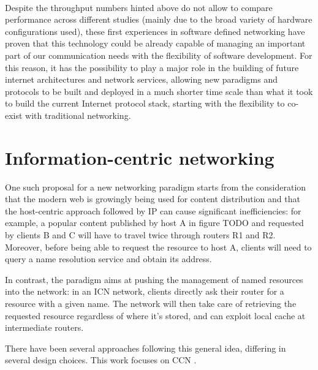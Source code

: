\documentclass[11pt,a4paper,twoside,titlepage,openany]{book}
\begin{document}
\paragraph{} Despite the throughput numbers hinted above do not allow to compare performance across different studies (mainly due to the broad variety of hardware configurations used), these first experiences in software defined networking have proven that this technology could be already capable of managing an important part of our communication needs with the flexibility of software development. For this reason, it has the possibility to play a major role in the building of future internet architectures and network services, allowing new paradigms and protocols to be built and deployed in a much shorter time scale than what it took to build the current Internet protocol stack, starting with the flexibility to co-exist with traditional networking.

\section{Information-centric networking}
One such proposal for a new networking paradigm starts from the consideration that the modern web is growingly being used for content distribution and that the host-centric approach followed by IP can cause significant inefficiencies: for example, a popular content published by host A in figure TODO
and requested by clients B and C will have to travel twice through routers R1 and R2. Moreover, before being able to request the resource to host A, clients will need to query a name resolution service and obtain its address.

In contrast, the  paradigm aims at pushing the management of named resources into the network: in an ICN network, clients directly ask their router for a resource with a given name. The network will then take care of retrieving the requested resource regardless of where it's stored, and can exploit local cache at intermediate routers.


There have been several approaches following this general idea, differing in several design choices. This work focuses on \gls{CCN} \cite{ccn}.

\end{document}
